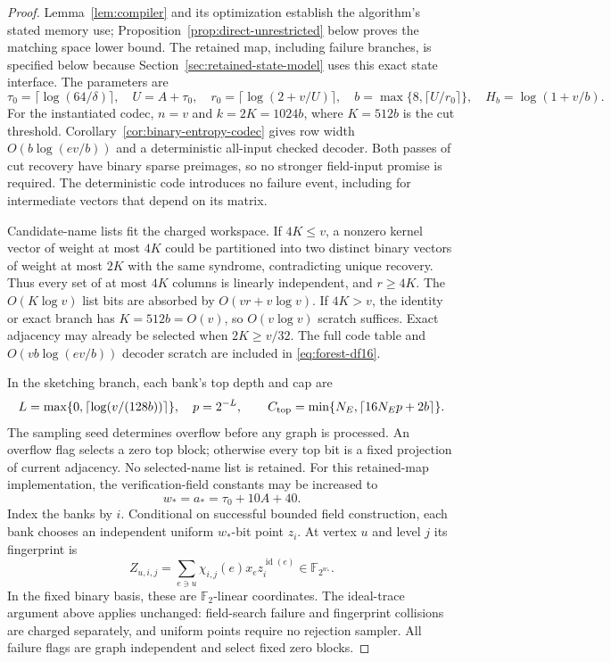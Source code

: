\documentclass[11pt,letterpaper]{article}
\numberwithin{equation}{section}
\begin{document}
\begin{proof}
Lemma~\ref{lem:compiler} and its optimization establish the algorithm's stated memory use; Proposition~\ref{prop:direct-unrestricted} below proves the matching space lower bound.
The retained map, including failure branches, is specified below because Section~\ref{sec:retained-state-model} uses this exact state interface.
The parameters are
\begin{equation}
\tau_0=\lceil\log(64/\delta)\rceil,\quad U=A+\tau_0,\quad
 r_0=\lceil\log(2+v/U)\rceil,\quad
 b=\max\{8,\lceil U/r_0\rceil\},\quad H_b=\log(1+v/b).
 \label{eq:lf3}
\end{equation}
For the instantiated codec, $n=v$ and $k=2K=1024b$, where $K=512b$ is the cut threshold.
Corollary~\ref{cor:binary-entropy-codec} gives row width $O(b\log(ev/b))$ and a deterministic all-input checked decoder.
Both passes of cut recovery have binary sparse preimages, so no stronger field-input promise is required.
The deterministic code introduces no failure event, including for intermediate vectors that depend on its matrix.

Candidate-name lists fit the charged workspace.
If $4K\le v$, a nonzero kernel vector of weight at most $4K$ could be partitioned into two distinct binary vectors of weight at most $2K$ with the same syndrome, contradicting unique recovery.
Thus every set of at most $4K$ columns is linearly independent, and $r\ge4K$.
The $O(K\log v)$ list bits are absorbed by $O(vr+v\log v)$.
If $4K>v$, the identity or exact branch has $K=512b=O(v)$, so $O(v\log v)$ scratch suffices.
Exact adjacency may already be selected when $2K\ge v/32$.
The full code table and $O(vb\log(ev/b))$ decoder scratch are included in \eqref{eq:forest-df16}.

In the sketching branch, each bank's top depth and cap are
\begin{equation}
L=\max\{0,\lceil\log(v/(128b))\rceil\},\quad p=2^{-L},
 \qquad C_{\rm top}=\min\{N_E,\lceil16N_Ep+2b\rceil\}.
 \label{eq:lf4}
\end{equation}
The sampling seed determines overflow before any graph is processed.
An overflow flag selects a zero top block; otherwise every top bit is a fixed projection of current adjacency.
No selected-name list is retained.
For this retained-map implementation, the verification-field constants may be increased to
\begin{equation}
w_*=a_*=\tau_0+10A+40. \label{eq:lf5}
\end{equation}
Index the banks by $i$. Conditional on successful bounded field construction, each bank chooses an independent uniform $w_*$-bit point $z_i$.
At vertex $u$ and level $j$ its fingerprint is
\begin{equation}
Z_{u,i,j}=\sum_{e\ni u}\chi_{i,j}(e)x_e
                    z_i^{\operatorname{id}(e)}
             \in\mathbb F_{2^{w_*}}. \label{eq:lf6}
\end{equation}
In the fixed binary basis, these are $\mathbb F_2$-linear coordinates.
The ideal-trace argument above applies unchanged: field-search failure and fingerprint collisions are charged separately, and uniform points require no rejection sampler.
All failure flags are graph independent and select fixed zero blocks.


\end{proof}
\end{document}
